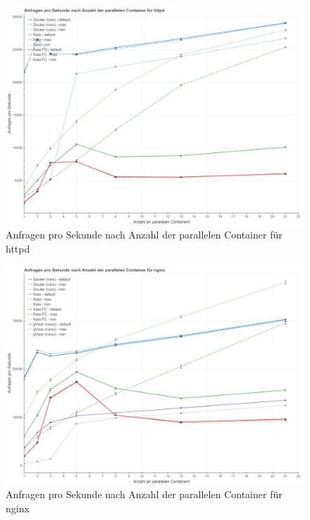 \begin{figure}[h]
	\centering
	\includegraphics[width=0.96\linewidth]{gfx/auswertung/ab_httpd.png}
	\caption{Anfragen pro Sekunde nach Anzahl der parallelen Container für httpd} 
	\label{fig:ab_httpd}
\end{figure}
\newpage
\begin{figure}[h]
	\centering
	\includegraphics[width=0.96\linewidth]{gfx/auswertung/ab_nginx.png}
	\caption{Anfragen pro Sekunde nach Anzahl der parallelen Container für nginx} 
	\label{fig:ab_nginx}
\end{figure}
\newpage

